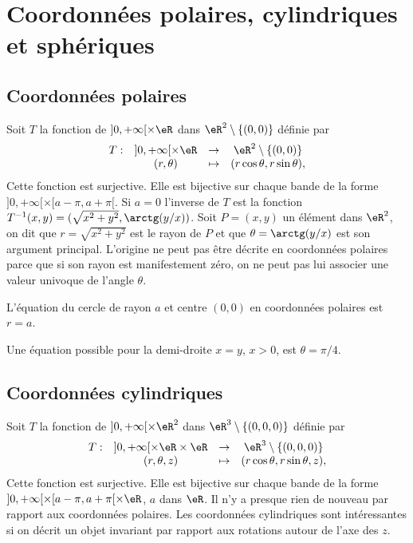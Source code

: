 \section{Coordonnées polaires, cylindriques et sphériques}\label{sec_coord}
\subsection{Coordonnées polaires}
Soit $T$ la fonction de $]0, +\infty[\times \eR$ dans $\eR^2\setminus\{(0,0)\}$ définie par
\begin{equation}
  \begin{array}{lccc}
    T: &]0, +\infty[\times \eR & \to & \eR^2\setminus\{(0,0)\}\\
 & (r, \theta)&\mapsto& (r\cos \theta, r \sin \theta),
  \end{array}
\end{equation}
Cette fonction est surjective. Elle est bijective sur chaque bande de la forme  $]0, +\infty[\times [a-\pi,a+\pi[$. Si $a=0$ l'inverse de $T$  est la fonction $T^{-1}(x,y)= (\sqrt{x^2+y^2}, \arctg (y/x))$. Soit $P=(x,y)$ un élément dans $\eR^2$, on dit que $r=\sqrt{x^2+y^2}$ est le rayon de $P$ et que $\theta=\arctg (y/x) $ est son argument principal. L'origine ne peut pas être décrite en coordonnées polaires parce que si son rayon est manifestement zéro, on ne peut pas lui associer une valeur univoque de l'angle $\theta$. 

\begin{example}
L'équation du cercle de rayon $a$ et centre $(0, 0)$ en coordonnées polaires est $r=a$. 
\end{example}

\begin{example}
	Une équation possible pour la demi-droite $x=y$, $x>0$,  est $\theta=\pi/4$.         
\end{example}

\subsection{Coordonnées cylindriques}
Soit $T$ la fonction de $]0, +\infty[\times \eR^2$ dans $\eR^3\setminus\{(0,0,0)\}$ définie par
\begin{equation}
  \begin{array}{lccc}
    T: &]0, +\infty[\times \eR\times \eR & \to & \eR^3\setminus\{(0,0,0)\}\\
 & (r, \theta, z)&\mapsto& (r\cos \theta, r \sin \theta, z),
  \end{array}
\end{equation}
Cette fonction est surjective. Elle est bijective sur chaque bande de la forme  $]0, +\infty[\times [a-\pi,a+\pi[\times \eR$, $a$ dans $\eR$. Il n'y a presque rien de nouveau par rapport aux coordonnées polaires. Les coordonnées  cylindriques sont intéressantes si on décrit un objet invariant par rapport aux rotations autour de l'axe des $z$. 

